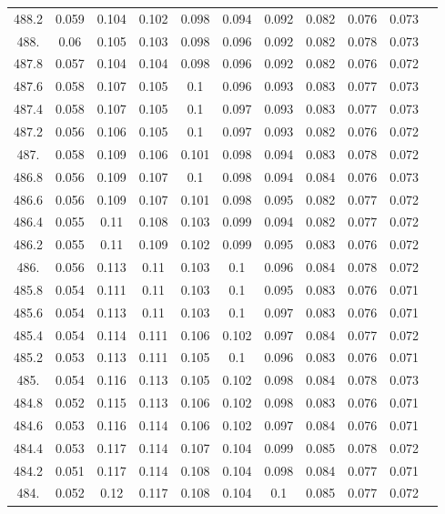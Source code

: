 \documentclass[12pt]{ctexart}
\numberwithin{equation}{section}
\begin{document}
\begin{longtable}{ccccccccccc}
488.2	&	0.059	&	0.104	&	0.102	&	0.098	&	0.094	&	0.092	&	0.082	&	0.076	&	0.073	\\
488.	&	0.06	&	0.105	&	0.103	&	0.098	&	0.096	&	0.092	&	0.082	&	0.078	&	0.073	\\
487.8	&	0.057	&	0.104	&	0.104	&	0.098	&	0.096	&	0.092	&	0.082	&	0.076	&	0.072	\\
487.6	&	0.058	&	0.107	&	0.105	&	0.1	&	0.096	&	0.093	&	0.083	&	0.077	&	0.073	\\
487.4	&	0.058	&	0.107	&	0.105	&	0.1	&	0.097	&	0.093	&	0.083	&	0.077	&	0.073	\\
487.2	&	0.056	&	0.106	&	0.105	&	0.1	&	0.097	&	0.093	&	0.082	&	0.076	&	0.072	\\
487.	&	0.058	&	0.109	&	0.106	&	0.101	&	0.098	&	0.094	&	0.083	&	0.078	&	0.072	\\
486.8	&	0.056	&	0.109	&	0.107	&	0.1	&	0.098	&	0.094	&	0.084	&	0.076	&	0.073	\\
486.6	&	0.056	&	0.109	&	0.107	&	0.101	&	0.098	&	0.095	&	0.082	&	0.077	&	0.072	\\
486.4	&	0.055	&	0.11	&	0.108	&	0.103	&	0.099	&	0.094	&	0.082	&	0.077	&	0.072	\\
486.2	&	0.055	&	0.11	&	0.109	&	0.102	&	0.099	&	0.095	&	0.083	&	0.076	&	0.072	\\
486.	&	0.056	&	0.113	&	0.11	&	0.103	&	0.1	&	0.096	&	0.084	&	0.078	&	0.072	\\
485.8	&	0.054	&	0.111	&	0.11	&	0.103	&	0.1	&	0.095	&	0.083	&	0.076	&	0.071	\\
485.6	&	0.054	&	0.113	&	0.11	&	0.103	&	0.1	&	0.097	&	0.083	&	0.076	&	0.071	\\
485.4	&	0.054	&	0.114	&	0.111	&	0.106	&	0.102	&	0.097	&	0.084	&	0.077	&	0.072	\\
485.2	&	0.053	&	0.113	&	0.111	&	0.105	&	0.1	&	0.096	&	0.083	&	0.076	&	0.071	\\
485.	&	0.054	&	0.116	&	0.113	&	0.105	&	0.102	&	0.098	&	0.084	&	0.078	&	0.073	\\
484.8	&	0.052	&	0.115	&	0.113	&	0.106	&	0.102	&	0.098	&	0.083	&	0.076	&	0.071	\\
484.6	&	0.053	&	0.116	&	0.114	&	0.106	&	0.102	&	0.097	&	0.084	&	0.076	&	0.071	\\
484.4	&	0.053	&	0.117	&	0.114	&	0.107	&	0.104	&	0.099	&	0.085	&	0.078	&	0.072	\\
484.2	&	0.051	&	0.117	&	0.114	&	0.108	&	0.104	&	0.098	&	0.084	&	0.077	&	0.071	\\
484.	&	0.052	&	0.12	&	0.117	&	0.108	&	0.104	&	0.1	&	0.085	&	0.077	&	0.072	\\

\end{longtable}
\end{document}
